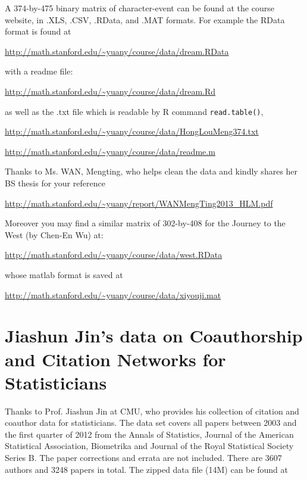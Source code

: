\documentclass[11pt]{article}
\begin{document}
A 374-by-475 binary matrix of character-event can be found at the course website, in .XLS, .CSV, .RData, and .MAT formats. For example the RData format is found at

\url{http://math.stanford.edu/~yuany/course/data/dream.RData} 

\noindent with a readme file:

\url{http://math.stanford.edu/~yuany/course/data/dream.Rd}

\noindent as well as the .txt file which is readable by R command {\tt read.table()},

\url{http://math.stanford.edu/~yuany/course/data/HongLouMeng374.txt}

\url{http://math.stanford.edu/~yuany/course/data/readme.m}

Thanks to Ms. WAN, Mengting, who helps clean the data and kindly shares her BS thesis for your reference
 
\url{http://math.stanford.edu/~yuany/report/WANMengTing2013_HLM.pdf}

%

Moreover you may find a similar matrix of 302-by-408 for the Journey to the West (by Chen-En Wu) at:

\url{http://math.stanford.edu/~yuany/course/data/west.RData}

\noindent whose matlab format is saved at

\url{http://math.stanford.edu/~yuany/course/data/xiyouji.mat}


\section{Jiashun Jin's data on Coauthorship and Citation Networks for Statisticians}
Thanks to Prof. Jiashun Jin at CMU, who provides his collection of citation and coauthor data for statisticians. The data set covers all papers between 2003 and the first quarter of 2012 from the Annals of Statistics, Journal of the American Statistical Association, Biometrika and Journal of the Royal Statistical Society Series B. The paper corrections and errata are not included. There are 3607 authors and 3248 papers in total. The zipped data file (14M) can be found at 
\end{document}
